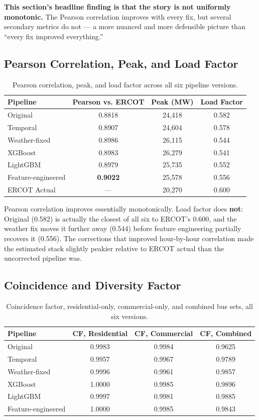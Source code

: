 \documentclass[11pt]{article}
\begin{document}
\textbf{This section's headline finding is that the story is not uniformly
monotonic.} The Pearson correlation improves with every fix, but several secondary
metrics do not --- a more nuanced and more defensible picture than ``every fix improved
everything.''

\subsection{Pearson Correlation, Peak, and Load Factor}

\begin{table}[H]
\centering
\begin{tabular}{lccc}
\toprule
Pipeline & Pearson vs. ERCOT & Peak (MW) & Load Factor \\
\midrule
Original & 0.8818 & 24{,}418 & 0.582 \\
Temporal & 0.8907 & 24{,}604 & 0.578 \\
Weather-fixed & 0.8986 & 26{,}115 & 0.544 \\
XGBoost & 0.8983 & 26{,}279 & 0.541 \\
LightGBM & 0.8979 & 25{,}735 & 0.552 \\
Feature-engineered & \textbf{0.9022} & 25{,}578 & 0.556 \\
\midrule
ERCOT Actual & --- & 20{,}270 & 0.600 \\
\bottomrule
\end{tabular}
\caption{Pearson correlation, peak, and load factor across all six pipeline
versions.}
\end{table}

Pearson correlation improves essentially monotonically. Load factor does
\textbf{not}: Original (0.582) is actually the closest of all six to ERCOT's 0.600,
and the weather fix moves it further away (0.544) before feature engineering
partially recovers it (0.556). The corrections that improved hour-by-hour
correlation made the estimated stack slightly peakier relative to ERCOT actual than
the uncorrected pipeline was.

\subsection{Coincidence and Diversity Factor}

\begin{table}[H]
\centering
\small
\begin{tabular}{lccc}
\toprule
Pipeline & CF, Residential & CF, Commercial & CF, Combined \\
\midrule
Original & 0.9983 & 0.9984 & 0.9625 \\
Temporal & 0.9957 & 0.9967 & 0.9789 \\
Weather-fixed & 0.9996 & 0.9961 & 0.9857 \\
XGBoost & 1.0000 & 0.9985 & 0.9896 \\
LightGBM & 0.9997 & 0.9981 & 0.9885 \\
Feature-engineered & 1.0000 & 0.9985 & 0.9843 \\
\bottomrule
\end{tabular}
\caption{Coincidence factor, residential-only, commercial-only, and combined bus
sets, all six versions.}
\end{table}
\end{document}
